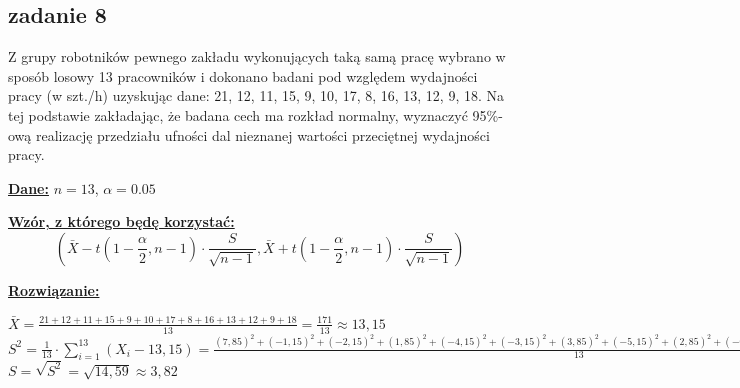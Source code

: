 \subsection{zadanie 8}
Z grupy robotników pewnego zakładu wykonujących taką samą pracę wybrano w sposób losowy 13 pracowników i dokonano badani pod względem wydajności pracy (w szt./h) uzyskując dane: 21, 12, 11, 15, 9, 10, 17, 8, 16, 13, 12, 9, 18. Na tej podstawie zakładając, że badana cech ma rozkład normalny, wyznaczyć 95\%-ową realizację przedziału ufności dal nieznanej wartości przeciętnej wydajności pracy.
\newline

\textbf{\underline{Dane:}}
$n = 13$,
$\alpha = 0.05$
\newline

\textbf{\underline{Wzór, z którego będę korzystać:}}
$$
\left(
\bar X - t \left(1-\frac{\alpha}{2},n-1 \right) \cdot \frac{S}{\sqrt{n-1}},
\bar X + t \left(1-\frac{\alpha}{2},n-1 \right) \cdot \frac{S}{\sqrt{n-1}}
\right)
$$

\textbf{\underline{Rozwiązanie:}}

\begin{flushleft} 
\large{$\bar X = \frac{21+12+11+15+9+10+17+8+16+13+12+9+18}{13} =\frac{171}{13} \approx 13,15$} \newline \newline
\large{$S^{2} = \frac{1}{13} \cdot \sum_{i=1}^{13} (X_{i} - 13,15) = \frac{(7,85)^{2}+(-1,15)^{2}+(-2,15)^{2}+(1,85)^{2}+(-4,15)^{2}+(-3, 15)^{2}+(3,85)^{2}+(-5,15)^{2}+(2,85)^{2}+(-0,15)^{2}+(-1,15)^{2}+(-4,15)^{2}+(4,85)^{2}}{13} = \frac{189,6925}{13} \approx 14,59$} \newline \newline
$S = \sqrt{S^{2}}  = \sqrt{14,59} \approx 3,82$
\end{flushleft}

